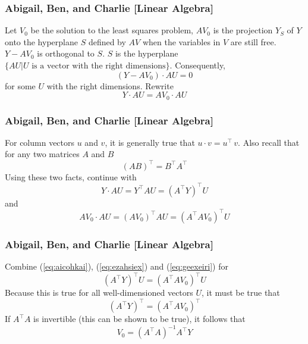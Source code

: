 \documentclass[xcolor=dvipsnames]{beamer}
\begin{document}
\begin{frame}
  \frametitle{Abigail, Ben, and Charlie [Linear Algebra]}
  Let $V_{0}$ be the solution to the least squares problem, $AV_{0}$
  is the projection $Y_{S}$ of $Y$ onto the hyperplane $S$ defined by
  $AV$ when the variables in $V$ are still free. $Y-AV_{0}$ is
  orthogonal to $S$. $S$ is the hyperplane $\{AU|U\mbox{ is a vector
    with the right dimensions}\}$. Consequently,
  \begin{equation}
    \label{eq:aebohche}
    (Y-AV_{0})\cdot{}AU=0
  \end{equation}
  for some $U$ with the right dimensions. Rewrite
  \begin{equation}
    \label{eq:aicohkai}
    Y\cdot{}AU=AV_{0}\cdot{}AU
  \end{equation}
\end{frame}

\begin{frame}
  \frametitle{Abigail, Ben, and Charlie [Linear Algebra]}
For column vectors $u$ and $v$, it is generally true that
$u\cdot{}v=u^{\intercal}\,v$. Also recall that for any two matrices
$A$ and $B$
\begin{equation}
  \label{eq:yaephubo}
    (AB)^{\intercal}=B^{\intercal}A^{\intercal}
\end{equation}
Using these two facts, continue with
\begin{equation}
  \label{eq:ezahsiex}
  Y\cdot{}AU=Y^{\intercal}AU=(A^{\intercal}Y)^{\intercal}U
\end{equation}
and
\begin{equation}
  \label{eq:geexeiri}
  AV_{0}\cdot{}AU=(AV_{0})^{\intercal}AU=(A^{\intercal}AV_{0})^{\intercal}U
\end{equation}
\end{frame}

\begin{frame}
  \frametitle{Abigail, Ben, and Charlie [Linear Algebra]}
Combine (\ref{eq:aicohkai}), (\ref{eq:ezahsiex}) and (\ref{eq:geexeiri}) for
\begin{equation}
  \label{eq:eighaidi}
  (A^{\intercal}Y)^{\intercal}U=(A^{\intercal}AV_{0})^{\intercal}U
\end{equation}
Because this is true for all well-dimensioned vectors $U$, it must be
true that
\begin{equation}
  \label{eq:feizahgh}
  (A^{\intercal}Y)^{\intercal}=(A^{\intercal}AV_{0})^{\intercal}
\end{equation}
If $A^{\intercal}A$ is invertible (this can be shown to be true), it
follows that
\begin{equation}
  \label{eq:waheisha}
  V_{0}=(A^{\intercal}A)^{-1}A^{\intercal}Y
\end{equation}
\end{frame}
\end{document}
